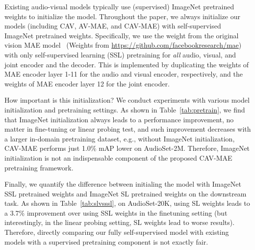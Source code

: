 \documentclass{article} \usepackage{iclr2023_conference,times}
\begin{document}
Existing audio-visual models typically use (supervised) ImageNet pretrained weights to initialize the model. Throughout the paper, we always initialize our models (including CAV, AV-MAE, and CAV-MAE) with self-supervised ImageNet pretrained weights. Specifically, we use the weight from the original vision MAE model~\citep{he2022masked} (Weights from \url{https://github.com/facebookresearch/mae}) with only self-supervised learning (SSL) pretraining for \emph{all} audio, visual, and joint encoder and the decoder. This is implemented by duplicating the weights of MAE encoder layer 1-11 for the audio and visual encoder, respectively, and the weights of MAE encoder layer 12 for the joint encoder. 

How important is this initialization? We conduct experiments with various model initialization and pretraining settings. As shown in Table~\ref{tab:pretrain}, we find that ImageNet initialization always leads to a performance improvement, no matter in fine-tuning or linear probing test, and such improvement decreases with a larger in-domain pretraining dataset, e.g., without ImageNet initialization, CAV-MAE performs just 1.0\% mAP lower on AudioSet-2M. Therefore, ImageNet initialization is not an indispensable component of the proposed CAV-MAE pretraining framework.

Finally, we quantify the difference between initialing the model with ImageNet SSL pretrained weights and ImageNet SL pretrained weights on the downstream task. As shown in Table~\ref{tab:slvsssl}, on AudioSet-20K, using SL weights leads to a 3.7\% improvement over using SSL weights in the finetuning setting (but interestingly, in the linear probing setting, SL weights lead to worse results). Therefore, directly comparing our fully self-supervised model with existing models with a supervised pretraining component is not exactly fair.
\end{document}

